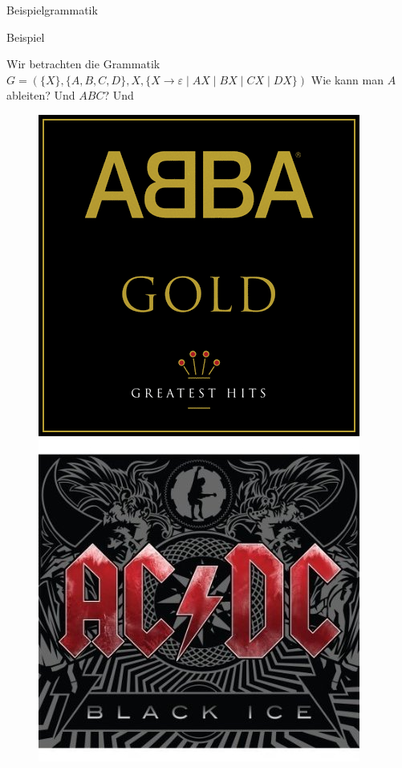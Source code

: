 \begin{frame}{Beispielgrammatik}
\begin{exampleblock}{Beispiel}
	
	Wir betrachten die Grammatik $G = (\{X\}, \{A, B, C, D\}, X, \{X \to \varepsilon \mid AX \mid BX \mid CX \mid DX\})$
		Wie kann man $A$ ableiten? Und $ABC$? \pause Und
		\begin{figure}[h!]
			\centering
			\includegraphics[scale=0.2]{../figures/ABBA_Gold_cover.png} \hspace{2em} \pause
			\includegraphics[scale=0.2]{../figures/acdc-black-ice.jpg} \hspace{2em} \pause

\end{figure}
\end{exampleblock}
\end{frame}
